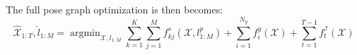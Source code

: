 \documentclass[12pt]{article}
\DeclareMathOperator*{\argmin}{argmin} %
\numberwithin{equation}{section}
\begin{document}
The full pose graph optimization is then becomes: 
	\begin{equation}
			\hat{\mathcal{X}}_{1:T}, \hat{l}_{1:M}=\argmin_{\mathcal{X}, l_{1:M}} \sum^K_{k=1} \sum^M_{j=1}f^s_{kj}(\mathcal{X}, l^p_{1:M}) + \sum^{N_y}_{i=1} f^y_i(\mathcal{X}) + \sum^{T-1}_{t=1} f^{\mathcal{I}}_t(\mathcal{X})
	\end{equation}
\renewcommand\refname{Reference}

 
\clearpage
\end{document}
